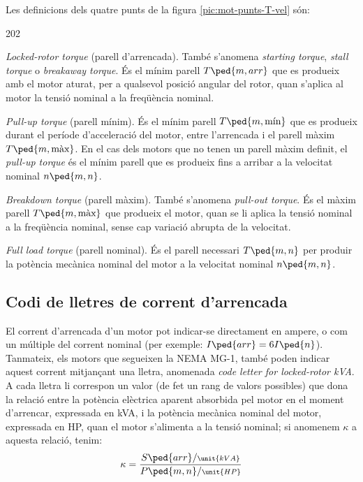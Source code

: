 Les definicions dels quatre punts de la figura  \vref{pic:mot-punts-T-vel} són:
\begin{dingautolist}{202}
   \item \textit{Locked-rotor torque} (parell d'arrencada). També s'anomena \textit{starting torque}, \textit{stall torque} o \textit{breakaway torque}. És el mínim parell $T\ped{m,arr}$ que es produeix amb el motor aturat, per a qualsevol posició angular del rotor, quan s'aplica al motor la tensió nominal a la freqüència nominal.
   \item \textit{Pull-up torque} (parell mínim). És el mínim parell $T\ped{m,\text{mín}}$ que es produeix durant el període d'acceleració del motor, entre l'arrencada  i el parell màxim $T\ped{m,\text{màx}}$. En el cas dels motors que no tenen un parell màxim definit, el \textit{pull-up torque} és el mínim parell que es produeix fins a arribar a la velocitat nominal $n\ped{m,n}$.
   \item \textit{Breakdown torque} (parell màxim). També s'anomena \textit{pull-out torque}. És el màxim parell $T\ped{m,\text{màx}}$ que  produeix  el motor, quan se li aplica  la tensió nominal a la freqüència nominal, sense cap variació abrupta de la velocitat.
   \item \textit{Full load torque} (parell nominal). És el parell necessari $T\ped{m,n}$ per produir la potència mecànica nominal del motor a la velocitat nominal  $n\ped{m,n}$.
\end{dingautolist}

\subsection{Codi de lletres de corrent d'arrencada}

El corrent d'arrencada d'un motor pot indicar-se directament en ampere, o com un múltiple del corrent nominal (per exemple: $I\ped{arr} = 6 I\ped{n}$). Tanmateix, els motors que segueixen la NEMA MG-1, també poden indicar aquest corrent mitjançant una lletra, anomenada \textit{code letter for locked-rotor kVA}. A cada lletra li correspon un valor (de fet un rang de valors possibles) que dona la relació entre la potència elèctrica aparent absorbida pel motor en el moment d'arrencar, expressada en kVA, i la potència mecànica nominal del motor, expressada en HP, quan el motor s'alimenta a la tensió nominal; si anomenem $\kappa$ a aquesta relació, tenim:
\begin{equation}
    \kappa = \frac{S\ped{arr}/{\scriptstyle\unit{kVA}}}{P\ped{m,n}/{\scriptstyle \unit{HP}}}
\end{equation}

